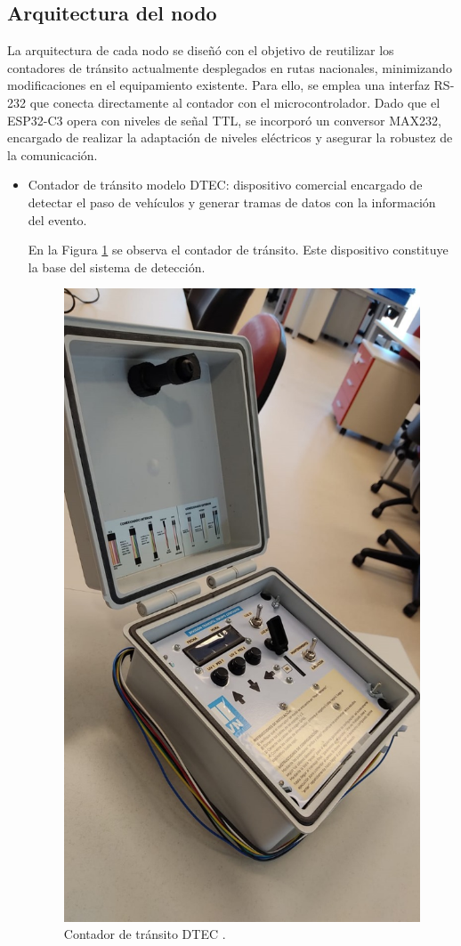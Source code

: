 \subsection{Arquitectura del nodo}
La arquitectura de cada nodo se diseñó con el objetivo de reutilizar los contadores de tránsito actualmente desplegados en rutas nacionales, minimizando modificaciones en el equipamiento existente. Para ello, se emplea una interfaz RS-232 que conecta directamente al contador con el microcontrolador. Dado que el ESP32-C3 opera con niveles de señal TTL, se incorporó un conversor MAX232, encargado de realizar la adaptación de niveles eléctricos y asegurar la robustez de la comunicación.

\begin{itemize}
    \item Contador de tránsito modelo DTEC: dispositivo comercial encargado de detectar el paso de vehículos y generar tramas de datos con la información del evento.
   
En la Figura \ref{fig:foto_dtec} se observa el contador de tránsito. Este dispositivo constituye la base del sistema de detección. 

\begin{figure}[htbp]
  \centering
  \includegraphics[width=0.5\linewidth]{./Figures/fotoDTEC.jpeg}
  \caption{Contador de tránsito DTEC \protect\footnotemark.}
  \label{fig:foto_dtec}
\end{figure}


\end{itemize}
